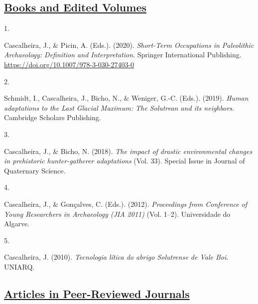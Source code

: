 \documentclass[11pt,a4paper,]{awesome-cv}
\newlength{\cslhangindent}
\newlength{\csllabelwidth}
\newenvironment{CSLReferences}[2] %
 {\begin{list}{}{%
  \setlength{\itemindent}{0pt}
  \setlength{\leftmargin}{0pt}
  \setlength{\parsep}{0pt}
  \ifodd #1
   \setlength{\leftmargin}{\cslhangindent}
   \setlength{\itemindent}{-1\cslhangindent}
  \fi
  \setlength{\itemsep}{#2\baselineskip}}}
 {\end{list}}
\newcommand{\CSLLeftMargin}[1]{\parbox[t]{\csllabelwidth}{\strut#1\strut}}
\newcommand{\CSLRightInline}[1]{\parbox[t]{\linewidth - \csllabelwidth}{\strut#1\strut}}
\begin{document}
\subsection{\texorpdfstring{\ul{Books and Edited
Volumes}}{Books and Edited Volumes}}\label{books-and-edited-volumes}

\label{refs-5cfe0b5dc3734c54a3119901f1778840}
\begin{CSLReferences}{0}{0}
\CSLLeftMargin{1. }%
\CSLRightInline{Cascalheira, J., \& Picin, A. (Eds.). (2020).
\emph{Short-Term Occupations in Paleolithic Archaeology: Definition and
Interpretation}. Springer International Publishing.
\url{https://doi.org/10.1007/978-3-030-27403-0}}

\CSLLeftMargin{2. }%
\CSLRightInline{Schmidt, I., Cascalheira, J., Bicho, N., \& Weniger,
G.-C. (Eds.). (2019). \emph{Human adaptations to the Last Glacial
Maximum: The Solutrean and its neighbors.} Cambridge Scholars
Publishing.}

\CSLLeftMargin{3. }%
\CSLRightInline{Cascalheira, J., \& Bicho, N. (2018). \emph{The impact
of drastic environmental changes in prehistoric hunter-gatherer
adaptations} (Vol. 33). Special Issue in Journal of Quaternary Science.}

\CSLLeftMargin{4. }%
\CSLRightInline{Cascalheira, J., \& Gonçalves, C. (Eds.). (2012).
\emph{Proceedings from Conference of Young Researchers in Archaeology
(JIA 2011)} (Vol. 1--2). Universidade do Algarve.}

\CSLLeftMargin{5. }%
\CSLRightInline{Cascalheira, J. (2010). \emph{Tecnologia lítica do
abrigo Solutrense de Vale Boi}. UNIARQ.}

\end{CSLReferences}

\subsection{\texorpdfstring{\ul{Articles in Peer-Reviewed
Journals}}{Articles in Peer-Reviewed Journals}}\label{articles-in-peer-reviewed-journals}
\end{document}
